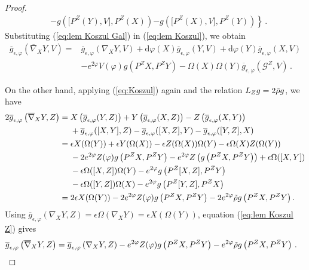 \documentclass[12pt]{article}
\newcommand{\diff}{\mathrm{d}}
\begin{document}
\begin{proof}
\begin{equation}
\begin{aligned}
    & -g\left(\big[P^Z(Y), V\big], P^Z(X)\right) \left. -g\left(\big[P^Z(X), V\big], P^Z(Y)\right)\right\} \,.
    \end{aligned}
    \end{equation}
    Substituting (\ref{eq:lem Koszul Gal}) in (\ref{eq:lem Koszul}), we obtain 
    \[
    \begin{aligned}
    \overline{g}_{\epsilon, \varphi}\left(\overline{\nabla}_X Y, V\right)={}& \overline{g}_{\epsilon, \varphi}\left(\nabla_X Y, V\right)+\diff \varphi(X) \overline{g}_{\epsilon, \varphi}(Y, V)+ \diff \varphi(Y) \overline{g}_{\epsilon, \varphi}(X, V) \\
    & -e^{2\varphi} V(\varphi) g\left(P^Z X, P^Z Y\right)-\Omega(X) \Omega(Y) \overline{g}_{\epsilon, \varphi}\left(\mathcal{G}^Z, V\right)\,.
    \end{aligned}
    \]

    On the other hand, applying (\ref{eq:Koszul}) again and the relation $L_Z g = 2 \Tilde{\rho} g$, we have
    \begin{equation}\label{eq:lem Koszul Z}
    \footnotesize
    \begin{aligned}
    2 \overline{g}_{\epsilon, \varphi}\left(\overline{\nabla}_X Y, Z\right) ={}& X\left(\overline{g}_{\epsilon, \varphi}(Y, Z)\right)+Y\left(\overline{g}_{\epsilon, \varphi}(X, Z)\right)-Z\left(\overline{g}_{\epsilon, \varphi}(X, Y)\right) \\
    & +\overline{g}_{\epsilon, \varphi}([X, Y], Z)-\overline{g}_{\epsilon, \varphi}([X, Z], Y)-\overline{g}_{\epsilon, \varphi}([Y, Z], X) \\
    ={}& \epsilon X(\Omega(Y))+\epsilon Y(\Omega(X))-\epsilon Z(\Omega(X)) \Omega(Y)-\epsilon \Omega(X) Z(\Omega(Y)) \\
    & -2 e^{2 \varphi} Z(\varphi) g\left(P^Z X, P^Z Y\right)-e^{2 \varphi} Z\left(g\left(P^Z X, P^Z Y\right)\right)+\epsilon \Omega([X, Y]) \\
    & -\epsilon \Omega([X, Z]) \Omega(Y)-e^{2 \varphi} g\left(P^Z[X, Z], P^Z Y\right) \\
    & -\epsilon \Omega([Y, Z]) \Omega(X)-e^{2 \varphi} g\left(P^Z[Y, Z], P^Z X\right) \\
    ={}& 2 \epsilon X(\Omega(Y))-2 e^{2 \varphi} Z(\varphi) g\left(P^Z X, P^Z Y\right) - 2 e^{2 \varphi} \Tilde{\rho} g\left(P^Z X, P^Z Y\right) .
    \end{aligned}
    \end{equation}
    Using $\overline{g}_{\epsilon, \varphi}\left(\nabla_X Y, Z\right)=\epsilon \Omega\left(\nabla_X Y\right)=\epsilon X(\Omega(Y))$, equation (\ref{eq:lem Koszul Z}) gives
    $$
    \begin{aligned}
    \overline{g}_{\epsilon, \varphi}\left(\overline{\nabla}_X Y, Z\right) ={}& \overline{g}_{\epsilon, \varphi}\left(\nabla_X Y, Z\right)-e^{2 \varphi} Z(\varphi) g\left(P^Z X, P^Z Y\right) - e^{2 \varphi} \Tilde{\rho} g\left(P^Z X, P^Z Y\right) \,.
    \end{aligned}
    $$
    
\end{proof}
\end{document}
